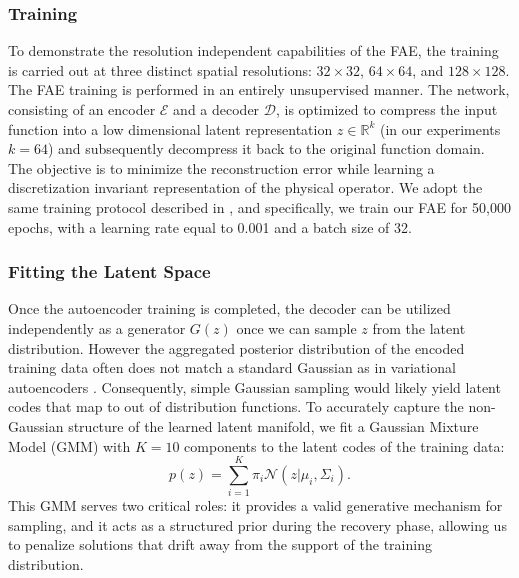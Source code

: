 \documentclass[a4paper,oneside]{amsart}
\begin{document}
\subsubsection{Training}
To demonstrate the resolution independent capabilities of the FAE, the training is carried out at three distinct spatial resolutions: $32\times32$, $64\times64$, and $128\times128$. The FAE training is performed in an entirely unsupervised manner. The network, consisting of an encoder $\mathcal{E}$ and a decoder $\mathcal{D}$, is optimized to compress the input function into a low dimensional latent representation $z \in \mathbb{R}^k$ (in our experiments $k=64$) and subsequently decompress it back to the original function domain. The objective is to minimize the reconstruction error while learning a discretization invariant representation of the physical operator. We adopt the same training protocol described in \cite{bunker2025autoencoders}, and specifically, we train our FAE for 50,000 epochs, with a learning rate equal to 0.001 and a batch size of 32.
\subsubsection{Fitting the Latent Space}
Once the autoencoder training is completed, the decoder can be utilized independently as a generator $G(z)$ once we can sample $z$ from the latent distribution. However the aggregated posterior distribution of the encoded training data often does not match a standard Gaussian as in variational autoencoders \cite{kingma2013auto}. Consequently, simple Gaussian sampling would likely yield latent codes that map to out of distribution functions.
To accurately capture the non-Gaussian structure of the learned latent manifold, we fit a Gaussian Mixture Model (GMM) with $K=10$ components to the latent codes of the training data:
\begin{equation}\label{prior}
    p(z) = \sum_{i=1}^{K} \pi_i \mathcal{N}(z|\mu_i, \Sigma_i).
\end{equation}
This GMM serves two critical roles: it provides a valid generative mechanism for sampling, and it acts as a structured prior during the recovery phase, allowing us to penalize solutions that drift away from the support of the training distribution.
\end{document}
